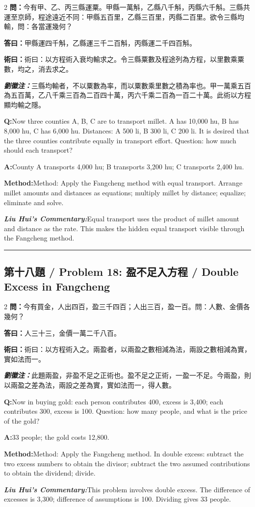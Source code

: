 \documentclass[11pt,a4paper]{article}
\newcommand{\cnwen}{\textcolor{cnlabelfg}{\textbf{問：}}}
\newcommand{\cnda}{\textbf{答曰：}}
\newcommand{\cnshu}{\textcolor{cnlabelfg}{\textbf{術曰：}}}
\newcommand{\cnzhu}{\textcolor{commentarycolor}{\textit{\textbf{劉徽注：}}}}
\newcommand{\enwen}{\textcolor{enlabelfg}{\textbf{Q:}}}
\newcommand{\enda}{\textcolor{enlabelfg}{\textbf{A:}}}
\newcommand{\enshu}{\textcolor{enlabelfg}{\textbf{Method:}}}
\newcommand{\enzhu}{\textcolor{enlabelfg}{\textit{\textbf{Liu Hui's Commentary:}}}}
\begin{document}
\begin{paracol}{2}
\switchcolumn[0]
\cnwen 今有甲、乙、丙三縣運粟。甲縣一萬斛，乙縣八千斛，丙縣六千斛。三縣共運至京師，程途遠近不同：甲縣五百里，乙縣三百里，丙縣二百里。欲令三縣均輸，問：各當運幾何？

\cnda 甲縣運四千斛，乙縣運三千二百斛，丙縣運二千四百斛。

\cnshu 術曰：以方程術入衰均輸求之。令三縣粟數及程途列為方程，以里數乘粟數，均之，消去求之。

\cnzhu 三縣均輸者，不以粟數為率，而以粟數乘里數之積為率也。甲一萬乘五百為五百萬，乙八千乘三百為二百四十萬，丙六千乘二百為一百二十萬。此術以方程顯均輸之隱。

\switchcolumn[1]
\enwen Now three counties A, B, C are to transport millet. A has 10,000 hu, B has 8,000 hu, C has 6,000 hu. Distances: A 500 li, B 300 li, C 200 li. It is desired that the three counties contribute equally in transport effort. Question: how much should each transport?

\enda County A transports 4,000 hu; B transports 3,200 hu; C transports 2,400 hu.

\enshu Method: Apply the Fangcheng method with equal transport. Arrange millet amounts and distances as equations; multiply millet by distance; equalize; eliminate and solve.

\enzhu Equal transport uses the product of millet amount and distance as the rate. This makes the hidden equal transport visible through the Fangcheng method.
\end{paracol}

\bigskip\hrule\bigskip

\subsection{第十八題 / Problem 18: 盈不足入方程 / Double Excess in Fangcheng}

\begin{paracol}{2}
\switchcolumn[0]
\cnwen 今有買金，人出四百，盈三千四百；人出三百，盈一百。問：人數、金價各幾何？

\cnda 人三十三，金價一萬二千八百。

\cnshu 術曰：以方程術入之。兩盈者，以兩盈之數相減為法，兩設之數相減為實，實如法而一。

\cnzhu 此題兩盈，非盈不足之正術也。盈不足之正術，一盈一不足。今兩盈，則以兩盈之差為法，兩設之差為實，實如法而一，得人數。

\switchcolumn[1]
\enwen Now in buying gold: each person contributes 400, excess is 3,400; each contributes 300, excess is 100. Question: how many people, and what is the price of the gold?

\enda 33 people; the gold costs 12,800.

\enshu Method: Apply the Fangcheng method. In double excess: subtract the two excess numbers to obtain the divisor; subtract the two assumed contributions to obtain the dividend; divide.

\enzhu This problem involves double excess. The difference of excesses is 3,300; difference of assumptions is 100. Dividing gives 33 people.
\end{paracol}
\end{document}
